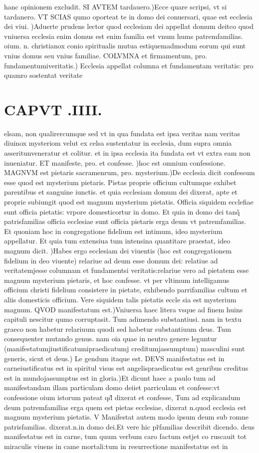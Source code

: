 \documentclass{article}
\begin{document}
\begin{pages}
hanc opinionem excludit. SI AVTEM tardauero.)Ecce quare scripsi, vt si tardanero. VT SCIAS qumo oporteat te in domo dei conuersari, quae est ecclesia dei viui. )Aduerte prudens lector quod ecclesiam dei appellat domum deitco quod vniuersa ecclesia enim domus est enim familia est vnum hums patremfamilias. oium. n. christianox conio spiritualis mutua estiquemadmodum eorum qui sunt vnius domus seu vnius familiae. COLVMNA et firmamentum, pro. fundamentumiveritatis.) Ecclesia appellat columna et fundamentam veritatis: pro quamro sostentat veritate  \pend
\section*{CAPVT .IIII. }
\marginpar{[ p.143 ]}\pstart elsam, non qualirercumque sed vt in qua fundata est ipsa veritas nam veritas diuinox mysteriom velut ex celsa sustentatur in ecclesia, dum supra omnia asseritunveneratur et colitur. et in ipsa ecclesia ita fundata est vt extra eam non inueniatur. ET manifeste, pro. et confesse. )hoc est omnium confessione. MAGNVM est pietaris sacramenrum, pro. mysterium.)De ecclesia dicit confessum esse quod est mysterium pietaris. Pietas proprie officium cultumque exhibet parentibus et sanguine iunctis. et quia ecclesiam domum dei dixerat, apte et proprie subiungit quod est magnum mysterium pietatis. Officia siquidem ecclefiae sunt officia pietatis: vrpore domesticortur in domo. Et quia in domo dei tanq̃ patrisfamilias officia ecclesiae sunt officia pietaris erga deum vt patremfamilias. Et quoniam hoc in congregatione fidelium est intimum, ideo mysterium appellatur. Et quia tum extensiua tum intensina quantitare praestat, ideo magnum dicit. )Habes ergo ecclesiam dei viuentis (hoc est congregationem fidelium in deo viuente) relariue ad deum esse domum dei: relatiue ad veritatemjesse columnam et fundamentsi veritatis:relariue vero ad pietatem esse magnum mysterium pietaris, et hoc confesse. vt per vltimum intelligamus officium christi fidelium consistere in pietate, exhibendo parrifamilias cultum et aliis domesticis officium. Vere siquidem talis pietatis eccle sia est mysterium magnum. QVOD manifestatum est.)Vniuersa haec litera vsque ad finem huins capituli nescitur qumo corruptasit. Tum adimendo substantiusi. nam in textu graeco non habetur relariuum quodi sed habetur substantiuum deus. Tum consequenter mutando genus. nam oia quae in neutro genere leguntur (manifestatumjiustificatumipraedicatumj creditumjassumptum) masculini sunt generis, sicut et deus.) Le gendum itaque est. DEVS manifestatus est in carneiustificatus est in spiritul visus est angelispraedicatus est genribus creditus est in mundojassumptus est in gloria.)Et dicunt haec a paulo tum ad manifestandam illam particulam domo deiiet parriculam et confesse:vt confessione oium istorum pateat qd̃ dixerat et confesse, Tum ad explicandum deum patremfamilias erga quem est pietas ecclesiae, dixerat n.quod ecclesia est magnum mysterium pietatis. V Manifestat autem modo ipsum deum sub romne patrisfamilias. dixerat.n.in domo dei.Et vere hic pr̃familias describit dicendo. deus manifestatus est in carne, tum quum verbum caro factum estjet co ruscauit tot miraculis viuens in came mortali:tum in resurrectione manifestatus est in 
\end{pages}
\end{document}
